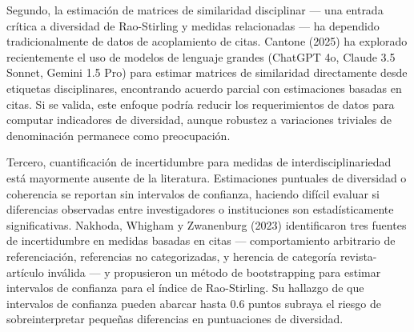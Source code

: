 \documentclass[
]{article}
\begin{document}
Segundo, la estimación de matrices de similaridad disciplinar --- una
entrada crítica a diversidad de Rao-Stirling y medidas relacionadas ---
ha dependido tradicionalmente de datos de acoplamiento de citas. Cantone
(2025) ha explorado recientemente el uso de modelos de lenguaje grandes
(ChatGPT 4o, Claude 3.5 Sonnet, Gemini 1.5 Pro) para estimar matrices de
similaridad directamente desde etiquetas disciplinares, encontrando
acuerdo parcial con estimaciones basadas en citas. Si se valida, este
enfoque podría reducir los requerimientos de datos para computar
indicadores de diversidad, aunque robustez a variaciones triviales de
denominación permanece como preocupación.

Tercero, cuantificación de incertidumbre para medidas de
interdisciplinariedad está mayormente ausente de la literatura.
Estimaciones puntuales de diversidad o coherencia se reportan sin
intervalos de confianza, haciendo difícil evaluar si diferencias
observadas entre investigadores o instituciones son estadísticamente
significativas. Nakhoda, Whigham y Zwanenburg (2023) identificaron tres
fuentes de incertidumbre en medidas basadas en citas --- comportamiento
arbitrario de referenciación, referencias no categorizadas, y herencia
de categoría revista-artículo inválida --- y propusieron un método de
bootstrapping para estimar intervalos de confianza para el índice de
Rao-Stirling. Su hallazgo de que intervalos de confianza pueden abarcar
hasta 0.6 puntos subraya el riesgo de sobreinterpretar pequeñas
diferencias en puntuaciones de diversidad.
\end{document}
